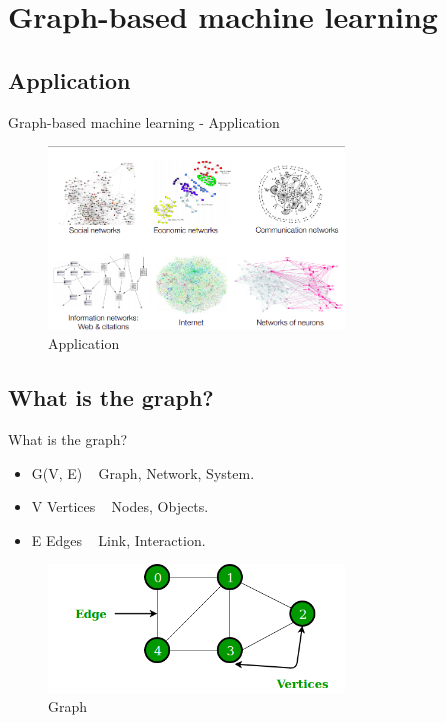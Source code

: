 \section{Graph-based machine learning}
\subsection{Application}
\begin{frame}{Graph-based machine learning - Application}
    \begin{figure}[htp]
        \centering
        \includegraphics[width=0.7\textwidth]{topics/201010-zhang2019comprehensive/assets/img/real-graph.png}
        \caption{Application}
        \label{fig:application}
    \end{figure}
\end{frame}
\subsection{What is the graph?}
\begin{frame}{What is the graph?}
    \begin{itemize}
        \item G(V, E) ~ Graph, Network, System.
        \item V Vertices ~ Nodes, Objects.
        \item E Edges ~ Link, Interaction.
    \end{itemize}
    \begin{figure}[htp]
        \centering
        \includegraphics[width=0.7\textwidth]{topics/201010-zhang2019comprehensive/assets/img/graph.png}
        \caption{Graph}
        \label{fig:graph}
    \end{figure}
\end{frame}
